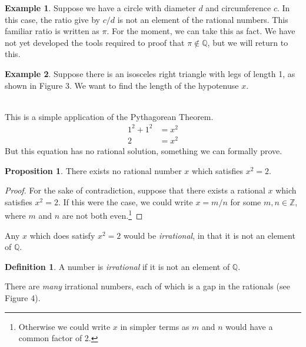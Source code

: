 \documentclass{article}
\newcommand{\Q}{\mathbb{Q}}
\newcommand{\Z}{\mathbb{Z}}
\theoremstyle{definition}
\newtheorem{proposition}{Proposition}[section]
\newtheorem{definition}{Definition}[section]
\newtheorem{example}{Example}[section]
\begin{document}
\begin{example}\label{ex4}
	Suppose we have a circle with diameter $ d $ and circumference $ c $. In this case, the ratio give by $ c/d $ is not an element of the rational numbers. This familiar ratio is written as $ \pi $. For the moment, we can take this as fact. We have not yet developed the tools required to proof that $ \pi\notin\Q $, but we will return to this.  
\end{example}
\begin{example}\label{ex5}
	Suppose there is an isosceles right triangle with legs of length 1, as shown in Figure 3. We want to find the length of the hypotenuse $ x $. 
	\begin{figure}[h]
		\centering
		\caption{}
	\end{figure}\\
This is a simple application of the Pythagorean Theorem. \begin{align*}
	1^2+1^2&=x^2\\2&=x^2
\end{align*}
But this equation has no rational solution, something we can formally prove. 
\end{example}
\begin{proposition}
	There exists no rational number $ x $ which satisfies $ x^2=2 $. 
\end{proposition}
\begin{proof}
	For the sake of contradiction, suppose that there exists a rational $ x $ which satisfies $ x^2=2 $. If this were the case, we could write $ x=m/n $ for some $ m,n\in\Z $, where $ m $ and $ n $ are not both even.\footnote{Otherwise we could write $ x $ in simpler terms as $ m $ and $ n $ would have a common factor of 2.}
\end{proof}
Any $ x $ which does satisfy $ x^2=2 $ would be \textit{irrational}, in that it is not an element of $ \Q $. 
\begin{definition}
	A number is {\color{red}\textit{irrational}} if it is not an element of $ \Q $. 
\end{definition}
\noindent There are \textit{many} irrational numbers, each of which is a gap in the rationals (see Figure 4). 
\end{document}
